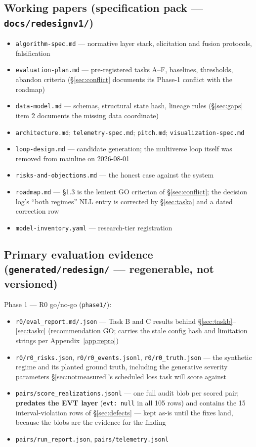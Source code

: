 \documentclass[11pt]{article}
\begin{document}
\subsection{Working papers (specification pack --- \texttt{docs/redesignv1/})}

\begin{itemize}[leftmargin=1.4em,itemsep=1pt]
\item \texttt{algorithm-spec.md} --- normative layer stack, elicitation and
  fusion protocols, falsification
\item \texttt{evaluation-plan.md} --- pre-registered tasks A--F, baselines,
  thresholds, abandon criteria (\S\ref{sec:conflict} documents its Phase-1
  conflict with the roadmap)
\item \texttt{data-model.md} --- schemas, structural state hash, lineage
  rules (\S\ref{sec:gaps} item 2 documents the missing data coordinate)
\item \texttt{architecture.md}; \texttt{telemetry-spec.md};
  \texttt{pitch.md}; \texttt{visualization-spec.md}
\item \texttt{loop-design.md} --- candidate generation; the multiverse loop
  itself was removed from mainline on 2026-08-01
\item \texttt{risks-and-objections.md} --- the honest case against the
  system
\item \texttt{roadmap.md} --- \S1.3 is the lenient GO criterion of
  \S\ref{sec:conflict}; the decision log's ``both regimes'' NLL entry is
  corrected by \S\ref{sec:taska} and a dated correction row
\item \texttt{model-inventory.yaml} --- research-tier registration
\end{itemize}

\subsection{Primary evaluation evidence (\texttt{generated/redesign/} --- regenerable, not versioned)}

Phase 1 --- R0 go/no-go (\texttt{phase1/}):

\begin{itemize}[leftmargin=1.4em,itemsep=1pt]
\item \texttt{r0/eval\_report.md/.json} --- Task B and C results behind
  \S\ref{sec:taskb}--\ref{sec:taskc} (recommendation GO; carries the stale
  config hash and limitation strings per Appendix~\ref{app:repro})
\item \texttt{r0/r0\_risks.json}, \texttt{r0/r0\_events.jsonl},
  \texttt{r0/r0\_truth.json} --- the synthetic regime and its planted
  ground truth, including the generative severity parameters
  \S\ref{sec:notmeasured}'s scheduled loss task will score against
\item \texttt{pairs/score\_realizations.jsonl} --- one full audit blob per
  scored pair; \textbf{predates the EVT layer} (\texttt{evt: null} in all
  105 rows) and contains the 15 interval-violation rows of
  \S\ref{sec:defects} --- kept as-is until the fixes land, because the
  blobs are the evidence for the finding
\item \texttt{pairs/run\_report.json}, \texttt{pairs/telemetry.jsonl}
\end{itemize}
\end{document}
